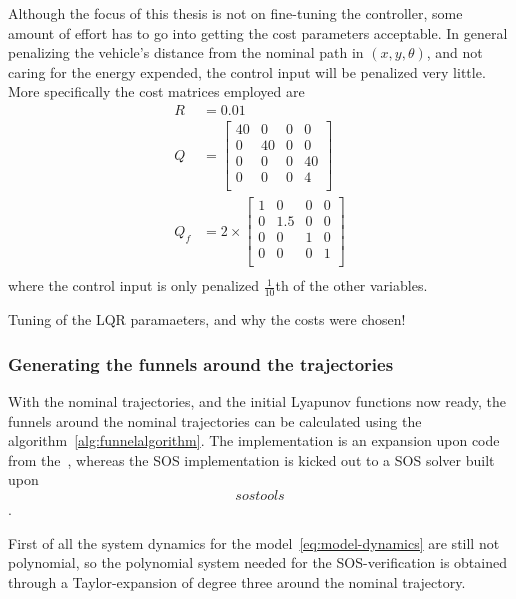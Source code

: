 Although the focus of this thesis is not on fine-tuning the controller, some
amount of effort has to go into getting the cost parameters acceptable. In
general penalizing the vehicle's distance from the nominal path in
\((x,y,\theta)\), and not caring for the energy expended, the control input will
be penalized very little. More specifically the cost matrices employed are
\begin{align*}
  R &= 0.01 \\
  Q &= \begin{bmatrix}
    40 & 0 & 0 & 0 \\
    0 & 40 & 0 & 0 \\
    0 & 0 & 0 & 40 \\
    0 & 0 & 0 & 4 \\
  \end{bmatrix}
  \\
  Q_{f} &=
          2\times
  \begin{bmatrix}
    1 & 0 & 0 & 0 \\
    0 & 1.5 & 0 & 0 \\
    0 & 0 & 1 & 0 \\
    0 & 0 & 0 & 1 \\
  \end{bmatrix}
\\
\end{align*}
where the control input is only penalized \(\frac{1}{10}\)th of the other
variables.

Tuning of the LQR paramaeters, and why the costs were chosen!

\subsubsection{Generating the funnels around the trajectories}

With the nominal trajectories, and the initial Lyapunov functions now ready, the
funnels around the nominal trajectories can be calculated using the
algorithm~\ref{alg:funnelalgorithm}. The implementation is an expansion upon
code from the~\cite[Drake toolbox]{drake}, whereas the \ac{SOS} implementation
is kicked out to a \ac{SOS} solver built upon~\[sostools\]\cite{sostools}.

First of all the system dynamics for the model~\ref{eq:model-dynamics} are still
not polynomial, so the polynomial system needed for the \ac{SOS}-verification is
obtained through a Taylor-expansion of degree three around the nominal
trajectory.

